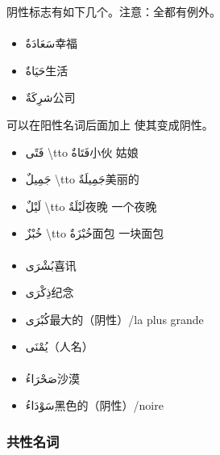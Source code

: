 阴性标志有如下几个。注意：全都有例外。

\paragraph{} 

\begin{itemize}
    \item \ac{سَعَادَةٌ}{幸福}
    \item \ac{حَيَاةٌ}{生活}
    \item \ac{شرِكَةٌ}{公司}
\end{itemize}

可以在阳性名词后面加上  使其变成阴性。

\begin{itemize}
    \item \ac{فَتًى \tto فَتَاةٌ}{小伙 \tto 姑娘}
    \item \ac{جَمِيلٌ \tto جَمِيلَةٌ}{美丽的}
    \item \ac{لَيْلٌ \tto لَيْلَةٌ}{夜晚 \tto 一个夜晚}
    \item \ac{خُبْزٌ \tto خُبْزَةٌ}{面包 \tto 一块面包}
\end{itemize}

\paragraph{}

\begin{itemize}
    \item \ac{بُشْرَى}{喜讯}
    \item \ac{ذِكْرَى}{纪念}
    \item \ac{كُبْرَى}{最大的（阴性）/la plus grande}
    \item \ac{يُمْنَى}{（人名）}
\end{itemize}

\paragraph{}

\begin{itemize}
    \item \ac{صَحْرَاءُ}{沙漠}
    \item \ac{سَوْدَاءُ}{黑色的（阴性）/noire}
\end{itemize}

\subsubsection{共性名词}

